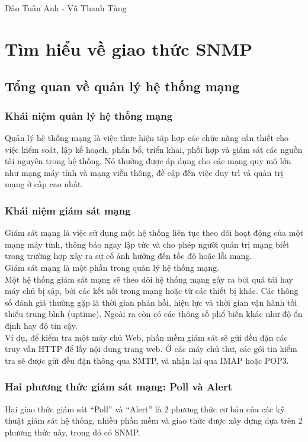 \documentclass[12pt,oneside,a4paper]{article}
\begin{document}
Đào Tuấn Anh - Vũ Thanh Tùng
\newpage

\section{Tìm hiểu về giao thức SNMP}
\subsection{Tổng quan về quản lý hệ thống mạng}
\subsubsection{Khái niệm quản lý hệ thống mạng}
Quản lý hệ thống mạng là việc thực hiện tập hợp các chức năng cần thiết cho việc kiểm soát, lập kế hoạch, phân bổ, triển khai, phối hợp và giám sát các nguồn tài nguyên trong hệ thống. Nó thường được áp dụng cho các mạng quy mô lớn như mạng máy tính và mạng viễn thông, đề cập đến việc duy trì và quản trị mạng ở cấp cao nhất.
\subsubsection{Khái niệm giám sát mạng}
Giám sát mạng là việc sử dụng một hệ thống liên tục theo dõi hoạt động của một mạng máy tính, thông báo ngay lập tức và cho phép người quản trị mạng biết trong trường hợp xảy ra sự cố ảnh hưởng đến tốc độ hoặc lỗi mạng.\\

Giám sát mạng là một phần trong quản lý hệ thống mạng.\\

Một hệ thống giám sát mạng sẽ theo dõi hệ thống mạng gây ra bởi quá tải hay máy chủ bị sập, bởi các kết nối trong mạng hoặc từ các thiết bị khác. Các thông số đánh giá thường gặp là thời gian phản hồi, hiệu lực và thời gian vận hành tối thiểu trung bình (uptime). Ngoài ra còn có các thông số phổ biến khác như độ ổn định hay độ tin cậy.\\

Ví dụ, để kiểm tra một máy chủ Web, phần mềm giám sát sẽ gửi đều đặn các truy vấn HTTP để lấy nội dung trang web. Ở các máy chủ thư, các gói tin kiểm tra sẽ được gửi đều đặn thông qua SMTP, và nhận lại qua IMAP hoặc POP3.
\subsubsection{Hai phương thức giám sát mạng: Poll và Alert}
Hai giao thức giám sát “Poll” và “Alert” là 2 phương thức cơ bản của các kỹ thuật giám sát hệ thống, nhiều phần mềm và giao thức được xây dựng dựa trên 2 phương thức này, trong đó có SNMP.\\
\end{document}
